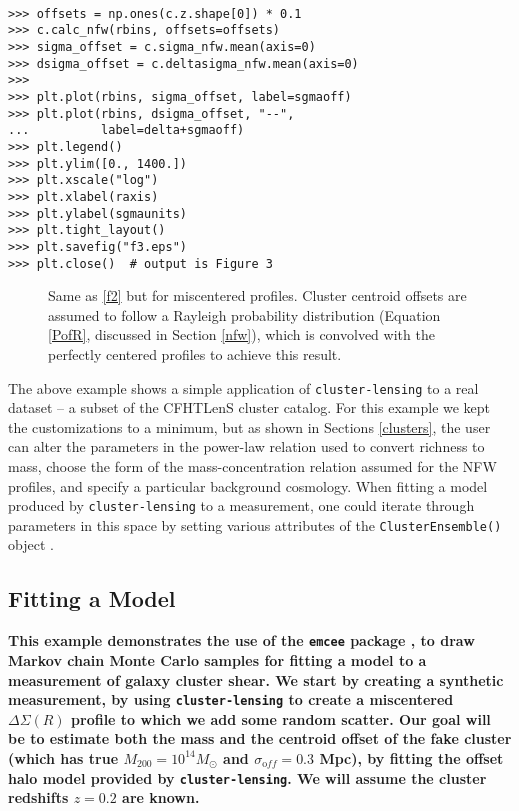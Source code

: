 \documentclass[twocolumn]{aastex6}
\newcommand{\code}{\lstinline[style=codeintext]}
\begin{document}
\begin{verbatim}

>>> offsets = np.ones(c.z.shape[0]) * 0.1
>>> c.calc_nfw(rbins, offsets=offsets)
>>> sigma_offset = c.sigma_nfw.mean(axis=0)
>>> dsigma_offset = c.deltasigma_nfw.mean(axis=0)
>>> 
>>> plt.plot(rbins, sigma_offset, label=sgmaoff)
>>> plt.plot(rbins, dsigma_offset, "--",
...          label=delta+sgmaoff)
>>> plt.legend()
>>> plt.ylim([0., 1400.])
>>> plt.xscale("log")
>>> plt.xlabel(raxis)
>>> plt.ylabel(sgmaunits)
>>> plt.tight_layout()
>>> plt.savefig("f3.eps")
>>> plt.close()  # output is Figure 3

\end{verbatim}
\begin{figure}
\caption{Same as \cref{f2} but for miscentered profiles. Cluster centroid offsets are assumed to follow a Rayleigh probability distribution (Equation \ref{PofR}, discussed in Section \ref{nfw}), which is convolved with the perfectly centered profiles to achieve this result.}
\label{f3}
\end{figure}

\pagebreak

The above example shows a simple application of \code{cluster-lensing} to a real dataset -- a subset of the CFHTLenS cluster catalog.  For this example we kept the customizations to a minimum, but as shown in Sections \ref{clusters}, the user can alter the parameters in the power-law relation used to convert richness to mass, choose the form of the mass-concentration relation assumed for the NFW profiles, and specify a particular background cosmology. When fitting a model produced by \code{cluster-lensing} to a measurement, one could iterate through parameters in this space by setting various attributes of the \code{ClusterEnsemble()} object \citep[as done, e.g. in][]{Ford14, Ford15}.


\subsection{Fitting a Model}
\label{emcee_ex}
{\bf This example demonstrates the use of the \code{emcee} package \citep{emcee}, to draw Markov chain Monte Carlo samples for fitting a model to a measurement of galaxy cluster shear. We start by creating a synthetic measurement, by using \code{cluster-lensing} to create a miscentered $\Delta\Sigma(R)$ profile to which we add some random scatter. Our goal will be to estimate both the mass and the centroid offset of the fake cluster (which has true $M_{200} = 10^{14} M_{\odot}$ and $\sigma_{\mathrm off} = 0.3$ Mpc), by fitting the offset halo model provided by \code{cluster-lensing}. We will assume the cluster redshifts $z = 0.2$ are known.}
\end{document}

